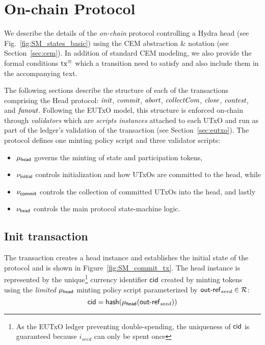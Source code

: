 \clearpage
\section{On-chain Protocol}\label{sec:on-chain}


We describe the details of the \emph{on-chain} protocol controlling a
Hydra head (see Fig.~\ref{fig:SM_states_basic}) using the CEM abstraction \&
notation (see Section~\ref{sec:cem}). In addition of standard CEM modeling, we
also provide the formal conditions $\mathrm{tx}^\equiv$ which a transition need to
satisfy and also include them in the accompanying text.

The following sections describe the structure of each of the transactions
comprising the Head protocol: $\textit{init}{}$, $\textit{commit}{}$, $\textit{abort}{}$,
$\textit{collectCom}{}$, $\textit{close}{}$, $\textit{contest}{}$, and $\textit{fanout}{}$. Following
the EUTxO model, this structure is enforced on-chain through \emph{validators}
which are \emph{scripts instances} attached to each UTxO and run as part of the
ledger's validation of the transaction (see Section~\ref{sec:eutxo}). The
protocol defines one minting policy script and three validator scripts:
\begin{itemize}
  \item $\mu_\mathsf{head}$ governs the minting of state and participation tokens,
  \item $\nu_{\mathsf{initial}}$ controls initialization and how UTxOs are committed to the head, while
  \item $\nu_{\mathsf{commit}}$ controls the collection of committed UTxOs into the head, and lastly
  \item $\nu_\mathsf{head}$ controls the main protocol state-machine logic.
\end{itemize}

\subsection{Init transaction}\label{sec:init-tx}

The \mtxInit{} transaction creates a head instance and establishes the initial
state of the protocol and is shown in Figure~\ref{fig:SM_commit_tx}. The head
instance is represented by the unique\footnote{As the EUTxO ledger preventing
  double-spending, the uniqueness of $\mathsf{cid}$ is guaranteed because $i_{seed}$ can
  only be spent once} currency identifier $\mathsf{cid}$ created by minting tokens using
the \emph{limited} $\mu_\mathsf{head}$ minting policy script parameterized by $\mathsf{out\textsf{-}{}ref}_{seed} \in \mathcal{R}$:
\[
  \mathsf{cid} = \mathsf{hash}(\mu_\mathsf{head}(\mathsf{out\textsf{-}{}ref}_{seed}))
\]

